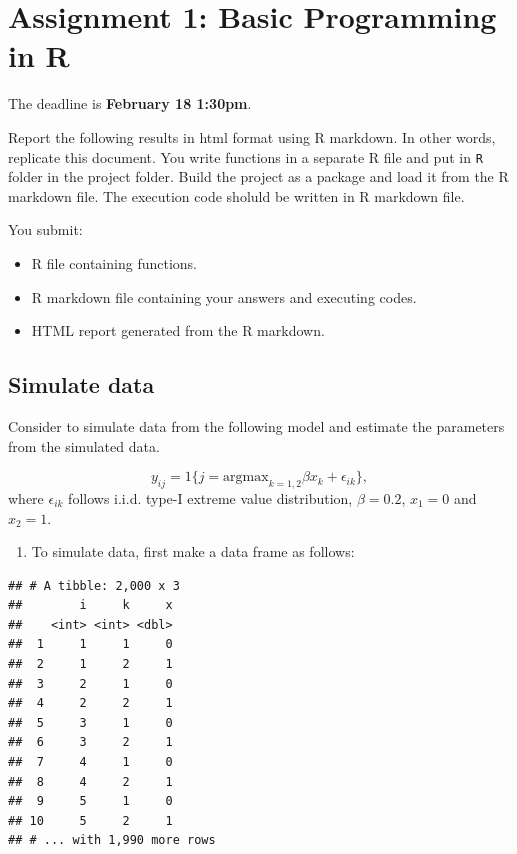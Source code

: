 \documentclass[]{book}
\providecommand{\tightlist}{%
  \setlength{\itemsep}{0pt}\setlength{\parskip}{0pt}}
\begin{document}
\chapter{Assignment 1: Basic Programming in R}\label{assignment1}

The deadline is \textbf{February 18 1:30pm}.

Report the following results in html format using R markdown. In other
words, replicate this document. You write functions in a separate R file
and put in \texttt{R} folder in the project folder. Build the project as
a package and load it from the R markdown file. The execution code
sholuld be written in R markdown file.

You submit:

\begin{itemize}
\tightlist
\item
  R file containing functions.
\item
  R markdown file containing your answers and executing codes.
\item
  HTML report generated from the R markdown.
\end{itemize}

\section{Simulate data}\label{simulate-data}

Consider to simulate data from the following model and estimate the
parameters from the simulated data.

\[
y_{ij} = 1\{j = \text{argmax}_{k = 1, 2} \beta x_k + \epsilon_{ik} \},
\] where \(\epsilon_{ik}\) follows i.i.d. type-I extreme value
distribution, \(\beta = 0.2\), \(x_1 = 0\) and \(x_2 = 1\).

\begin{enumerate}
\def\labelenumi{\arabic{enumi}.}
\tightlist
\item
  To simulate data, first make a data frame as follows:
\end{enumerate}

\begin{verbatim}
## # A tibble: 2,000 x 3
##        i     k     x
##    <int> <int> <dbl>
##  1     1     1     0
##  2     1     2     1
##  3     2     1     0
##  4     2     2     1
##  5     3     1     0
##  6     3     2     1
##  7     4     1     0
##  8     4     2     1
##  9     5     1     0
## 10     5     2     1
## # ... with 1,990 more rows
\end{verbatim}
\end{document}
